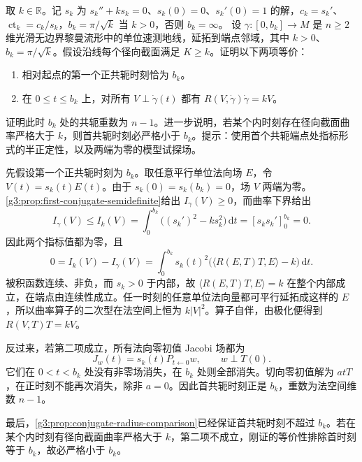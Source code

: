 \begin{exercise}\label{g3:ex:first-conjugate-upper-bound-rigidity}
	取 \(k\in\mathbb R\)。记 \(s_k\) 为 \(s_k''+ks_k=0\)、\(s_k(0)=0\)、\(s_k'(0)=1\) 的解，\(c_k=s_k'\)、\(\operatorname{ct}_k=c_k/s_k\)，\(b_k=\pi/\sqrt k\) 当 \(k>0\)，否则 \(b_k=\infty\)。
	设 \(\gamma:[0,b_k]\to M\) 是 \(n\ge2\) 维光滑无边界黎曼流形中的单位速测地线，延拓到端点邻域，其中 \(k>0\)、\(b_k=\pi/\sqrt k\)。假设沿线每个径向截面满足 \(K\ge k\)。证明以下两项等价：
	\begin{enumerate}
		\item 相对起点的第一个正共轭时刻恰为 \(b_k\)。
		\item 在 \(0\le t\le b_k\) 上，对所有 \(V\perp\dot\gamma(t)\) 都有 \(R(V,\dot\gamma)\dot\gamma=kV\)。
	\end{enumerate}
	证明此时 \(b_k\) 处的共轭重数为 \(n-1\)。进一步说明，若某个内时刻存在径向截面曲率严格大于 \(k\)，则首共轭时刻必严格小于 \(b_k\)。提示：使用首个共轭端点处指标形式的半正定性，以及两端为零的模型试探场。
\end{exercise}
\begin{solution}
	先假设第一个正共轭时刻为 \(b_k\)。取任意平行单位法向场 \(E\)，令 \(V(t)=s_k(t)E(t)\)。由于 \(s_k(0)=s_k(b_k)=0\)，场 \(V\) 两端为零。\cref{g3:prop:first-conjugate-semidefinite}给出 \(I_\gamma(V)\ge0\)，而曲率下界给出
	\[
		I_\gamma(V)\le I_k(V)
		=\int_0^{b_k}\bigl((s_k')^2-ks_k^2\bigr)\,\mathrm dt
		=[s_ks_k']_0^{b_k}=0.
	\]
	因此两个指标值都为零，且
	\[
		0=I_k(V)-I_\gamma(V)
		=\int_0^{b_k}s_k(t)^2
		\bigl(\langle R(E,T)T,E\rangle-k\bigr)\,\mathrm dt.
	\]
	被积函数连续、非负，而 \(s_k>0\) 于内部，故 \(\langle R(E,T)T,E\rangle=k\) 在整个内部成立，在端点由连续性成立。任一时刻的任意单位法向量都可平行延拓成这样的 \(E\)，所以曲率算子的二次型在法空间上恒为 \(k|V|^2\)。算子自伴，由极化便得到 \(R(V,T)T=kV\)。

	反过来，若第二项成立，所有法向零初值 Jacobi 场都为
	\[
		J_w(t)=s_k(t)P_{t\leftarrow0}w,
		\qquad w\perp T(0).
	\]
	它们在 \(0<t<b_k\) 处没有非零场消失，在 \(b_k\) 处则全部消失。切向零初值解为 \(atT\)，在正时刻不能再次消失，除非 \(a=0\)。因此首共轭时刻正是 \(b_k\)，重数为法空间维数 \(n-1\)。

	最后，\cref{g3:prop:conjugate-radius-comparison}已经保证首共轭时刻不超过 \(b_k\)。若在某个内时刻有径向截面曲率严格大于 \(k\)，第二项不成立，刚证的等价性排除首时刻等于 \(b_k\)，故必严格小于 \(b_k\)。
\end{solution}

